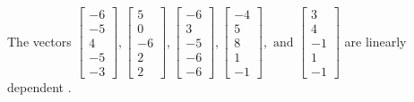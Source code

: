 \begin{exercise}
\begin{exerciseStatement}
  \end{exerciseStatement}
  \begin{exerciseAnswer}
   The vectors \(\left[\begin{array}{r}
-6 \\
-5 \\
4 \\
-5 \\
-3
\end{array}\right] , \left[\begin{array}{r}
5 \\
0 \\
-6 \\
2 \\
2
\end{array}\right] , \left[\begin{array}{r}
-6 \\
3 \\
-5 \\
-6 \\
-6
\end{array}\right] , \left[\begin{array}{r}
-4 \\
5 \\
8 \\
1 \\
-1
\end{array}\right] , \text{ and } \left[\begin{array}{r}
3 \\
4 \\
-1 \\
1 \\
-1
\end{array}\right]\) are 
  	 linearly dependent  .
  


  \end{exerciseAnswer}
\end{exercise}